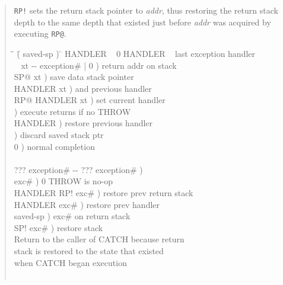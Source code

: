 \begin{intro}
\begin{quote}
\texttt{RP!} 
	sets the return stack pointer to \emph{addr}, thus restoring the
	return stack depth to the same depth that existed just before
	\emph{addr} was acquired by executing \texttt{RP@}.

	\ttfamily
	\begin{tabbing}
	\tab \= \tab \= \hspace{7em} \= ( saved-sp ) \= \kill
	 HANDLER ~ 0 HANDLER \word{!} ~  last exception handler \\[\parskip]

	\+ \word{:}  ~  xt -{}- exception\# | 0 )  return addr on stack \\
		SP@ 				\>\>  xt )	\>  save data stack pointer \\
		HANDLER  	\>\>  xt )	\>  and previous handler \\
		RP@ HANDLER \word{!}		\>\>  xt )	\>  set current handler \\
						\>\>  )		\>  execute returns if no THROW \\
		 HANDLER \word{!}	\>\>  )		\>  restore previous handler \\
		 		\>\>  )		\>  discard saved stack ptr \\
								\>\>  0 )	\>  normal completion \\
	\word{;} \\[\parskip]

	\+ \word{:}   ??? exception\# -{}- ??? exception\# ) \\
		\+  			\>\>  exc\# )	\>  0 THROW is no-op \\
			HANDLER  RP!			\>  exc\# ) \>  restore prev return stack \\
			 HANDLER \word{!}		\>  exc\# ) \>  restore prev handler \\
			   \>  saved-sp ) \>  exc\# on return stack \\
			SP!  		\>  exc\# ) 	\> \word{bs} restore stack \\
			 Return to the caller of CATCH because return \\
			 stack is restored to the state that existed \\
		\-	 when CATCH began execution \\
	\-  \\
	\word{;}
	\end{tabbing}
\end{quote}


\end{intro}
